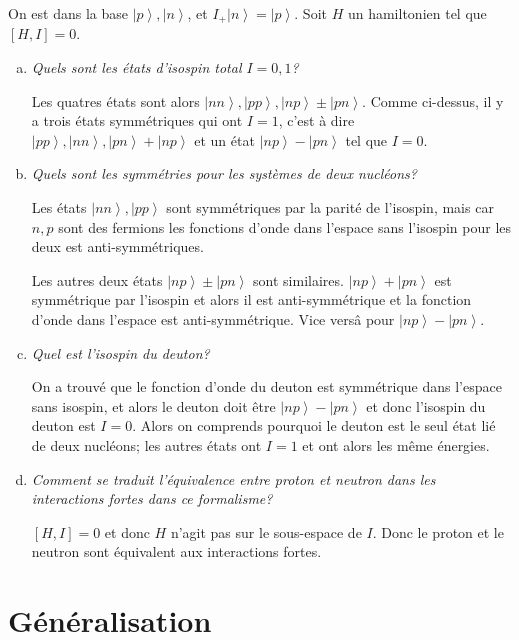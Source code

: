 \documentclass[10pt]{report}
\newcommand{\ket}[1]{\left|#1\right>}
\begin{document}
On est dans la base $\ket{p}, \ket{n}$, et $I_+\ket{n} = \ket{p}$. Soit $H$ un hamiltonien tel que $[H, I] = 0$.

\begin{enumerate}[a)]
    \item \emph{Quels sont les \'etats d'isospin total $I=0,1$?}

        Les quatres \'etats sont alors $\ket{nn}, \ket{pp}, \ket{np} \pm \ket{pn}$. Comme ci-dessus, il y a trois \'etats symm\'etriques qui ont $I=1$, c'est \`a dire $\ket{pp}, \ket{nn}, \ket{pn} + \ket{np}$ et un \'etat $\ket{np} - \ket{pn}$ tel que $I=0$.

    \item \emph{Quels sont les symm\'etries pour les syst\`emes de deux nucl\'eons?}

        Les \'etats $\ket{nn}, \ket{pp}$ sont symm\'etriques par la parit\'e de l'isospin, mais car $n,p$ sont des fermions les fonctions d'onde dans l'espace sans l'isospin pour les deux est anti-symm\'etriques.

        Les autres deux \'etats $\ket{np} \pm \ket{pn}$ sont similaires. $\ket{np} + \ket{pn}$ est symm\'etrique par l'isospin et alors il est anti-symm\'etrique et la fonction d'onde dans l'espace est anti-symm\'etrique. Vice vers\^a pour $\ket{np} - \ket{pn}$.

    \item \emph{Quel est l'isospin du deuton?}

        On a trouv\'e que le fonction d'onde du deuton est symm\'etrique dans l'espace sans isospin, et alors le deuton doit \^etre $\ket{np} - \ket{pn}$ et donc l'isospin du deuton est $I = 0$. Alors on comprends pourquoi le deuton est le seul \'etat li\'e de deux nucl\'eons; les autres \'etats ont $I=1$ et ont alors les m\^eme \'energies.

    \item \emph{Comment se traduit l'\'equivalence entre proton et neutron dans les interactions fortes dans ce formalisme?}

        $\left[ H,I \right] = 0$ et donc $H$ n'agit pas sur le sous-espace de $I$. Donc le proton et le neutron sont \'equivalent aux interactions fortes.
\end{enumerate}

\section{G\'en\'eralisation}
\end{document}
